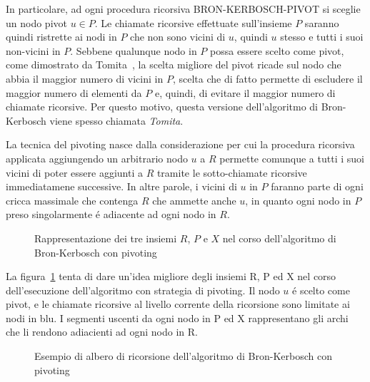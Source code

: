 

In particolare, ad ogni procedura ricorsiva BRON-KERBOSCH-PIVOT si sceglie un nodo pivot $u \in P$.
Le chiamate ricorsive effettuate sull'insieme $P$ saranno quindi ristrette ai nodi in $P$ che non sono vicini di $u$,
quindi $u$ stesso e tutti i suoi non-vicini in $P$.
Sebbene qualunque nodo in $P$ possa essere scelto come pivot, come dimostrato da Tomita~\cite{TOMITA200628},
la scelta migliore del pivot ricade sul nodo che abbia il maggior numero di vicini in $P$, scelta che di fatto
permette di escludere il maggior numero di elementi da $P$ e, quindi, di evitare il maggior numero di chiamate ricorsive.
Per questo motivo, questa versione dell'algoritmo di Bron-Kerbosch viene spesso chiamata \textit{Tomita}. \newline

La tecnica del pivoting nasce dalla considerazione per cui la procedura ricorsiva applicata aggiungendo un arbitrario
nodo $u$ a $R$ permette comunque a tutti i suoi vicini di poter essere aggiunti a $R$ tramite le sotto-chiamate
ricorsive immediatamene successive.
In altre parole, i vicini di $u$ in $P$ faranno parte di ogni cricca massimale che
contenga $R$ che ammette anche $u$, in quanto ogni nodo in $P$ preso singolarmente \'e adiacente ad ogni nodo in $R$.
\newline

\begin{figure}[H]
    \centering
    
    \caption{Rappresentazione dei tre insiemi $R$, $P$ e $X$ nel corso dell'algoritmo di Bron-Kerbosch con pivoting}
    \label{fig:bron_kerbosh_pivot_example}
\end{figure}

La figura~\ref{fig:bron_kerbosh_pivot_example} tenta di dare un'idea migliore degli insiemi R, P ed X nel corso
dell'esecuzione dell'algoritmo con strategia di pivoting.
Il nodo $u$ \'e scelto come pivot, e le chiamate ricorsive al livello corrente della ricorsione sono limitate ai nodi
in blu.
I segmenti uscenti da ogni nodo in P ed X rappresentano gli archi che li rendono adiacienti ad ogni nodo in R.

\begin{figure}[H]
    \centering
    
    \caption{Esempio di albero di ricorsione dell'algoritmo di Bron-Kerbosch con pivoting}
    \label{fig:bron_kerbosh_pivot_tree_example}
\end{figure}

